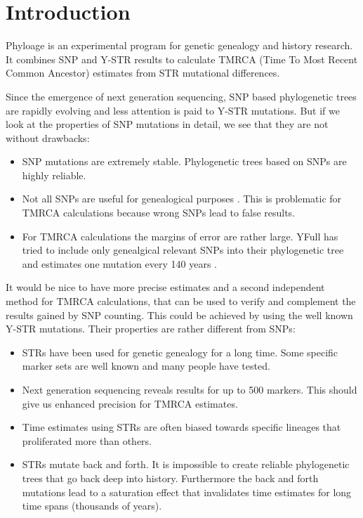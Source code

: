 \section{Introduction}

Phyloage is an experimental program for genetic genealogy
and history research. It combines SNP and Y-STR results to
calculate TMRCA (Time To Most Recent Common Ancestor)
estimates from STR mutational differences.

Since the emergence of next generation sequencing, SNP based
phylogenetic trees are rapidly evolving and less attention
is paid to Y-STR mutations. But if we look at the properties
of SNP mutations in detail, we see that they are not without
drawbacks:

\begin{itemize}
\item SNP mutations are extremely stable. Phylogenetic trees
	based on SNPs are highly reliable.
\item Not all SNPs are useful for genealogical purposes
	\cite{YFullMutationRate}. This is problematic for TMRCA
	calculations because wrong SNPs lead to false results.
\item For TMRCA calculations the margins of error are rather large.
	YFull has tried to include only genealgical relevant SNPs
	into their phylogenetic tree \cite{YFullTree} and estimates
	one mutation every 140 years \cite{YFullMutationRate}.
\end{itemize}

It would be nice to have more precise estimates and a second
independent method for TMRCA calculations, that can be used to
verify and complement the results gained by SNP counting.
This could be achieved by using the well known Y-STR mutations.
Their properties are rather different from SNPs:

\begin{itemize}
\item STRs have been used for genetic genealogy for a long
	time. Some specific marker sets are well known and many
	people have tested.
\item Next generation sequencing reveals results for up to
	500 markers. This should give us enhanced precision for
	TMRCA estimates.
\item Time estimates using STRs are often biased towards
	specific lineages that proliferated more than others.
\item STRs mutate back and forth. It is impossible to create
	reliable phylogenetic trees that go back deep into
	history. Furthermore the back and forth mutations lead
	to a saturation effect that invalidates time estimates
	for long time spans (thousands of years).
\end{itemize}

